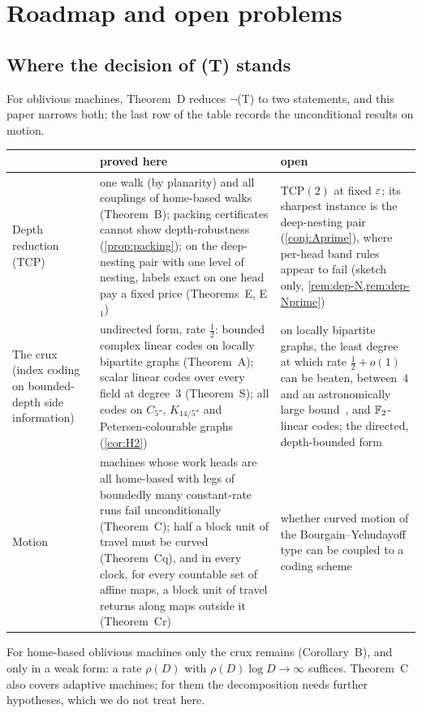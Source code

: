 \section{Roadmap and open problems}\label{sec:open}

\subsection{Where the decision of (T) stands}

For oblivious machines, Theorem~D reduces $\neg$(T) to two statements, and this paper narrows both; the last row of
the table records the unconditional results on motion.
\begin{center}
\begin{tabular}{@{}p{}p{}p{}@{}}
\toprule
 & \textbf{proved here} & \textbf{open} \\
\midrule
Depth reduction (TCP) &
one walk (by planarity) and all couplings of home-based walks (Theorem~B); packing certificates cannot show
depth-robustness (\cref{prop:packing}); on the deep-nesting pair with one level of nesting, labels exact on one head pay
a fixed price (Theorems~E, E$_1$) &
TCP$(2)$ at fixed $\varepsilon$; its sharpest instance is the deep-nesting pair (\cref{conj:Aprime}), where per-head band
rules appear to fail (sketch only, \cref{rem:dep-N,rem:dep-Nprime}) \\
\addlinespace
The crux (index coding on bounded-depth side information) &
undirected form, rate $\tfrac12$: bounded complex linear codes on locally bipartite graphs (Theorem~A); scalar linear codes
over every field at degree~$3$ (Theorem~S); all codes on $C_5$-, $K_{14/5}$- and Petersen-colourable graphs (\cref{cor:H2}) &
on locally bipartite graphs, the least degree at which rate $\tfrac12+o(1)$ can be beaten, between~$4$ and an
astronomically large bound~\cite{NestedElimination2026,StorageCodes2026}, and $\mathbb{F}_2$-linear codes; the directed,
depth-bounded form \\
\addlinespace
Motion &
machines whose work heads are all home-based with legs of boundedly many constant-rate runs fail unconditionally
(Theorem~C); half a block unit of travel must be curved (Theorem~Cq), and in every clock, for every countable set of
affine maps, a block unit of travel returns along maps outside it (Theorem~Cr) &
whether curved motion of the Bourgain--Yehudayoff type can be coupled to a coding scheme \\
\bottomrule
\end{tabular}
\end{center}
For home-based oblivious machines only the crux remains (Corollary~B), and only in a weak form: a rate $\rho(D)$ with
$\rho(D)\log D\to\infty$ suffices. Theorem~C also covers adaptive machines; for them the decomposition
needs further hypotheses, which we do not treat here.

